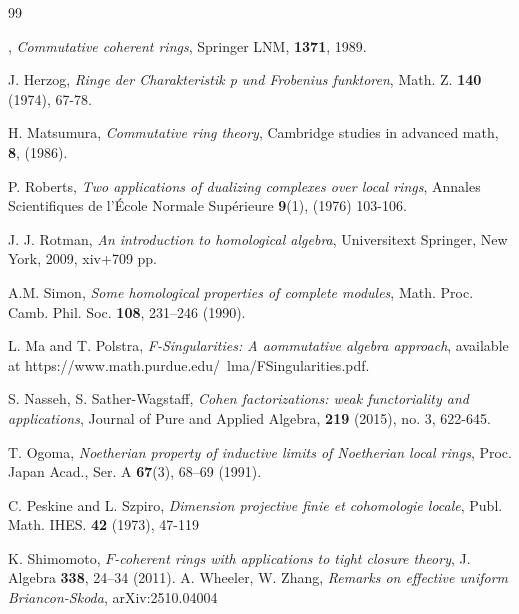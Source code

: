 \documentclass[11pt,a4paper]{amsart}
\numberwithin{equation}{section}
\theoremstyle{definition}
\theoremstyle{remark}
\begin{document}
\begin{thebibliography}{99}
		
, {\it Commutative coherent rings},
Springer LNM, {\bf1371}, 1989.
		
	 J. Herzog, \emph{Ringe der Charakteristik p und Frobenius funktoren}, Math. Z. 	{\bf140} (1974), 67-78.


		
	H. Matsumura, \emph{Commutative ring theory}, Cambridge studies in advanced math, \textbf{8}, (1986).
		
		 P. Roberts, \emph{Two applications of dualizing complexes over local rings}, Annales Scientifiques de l'École Normale Supérieure {\bf 9}(1), (1976) 103-106.

		
		
			
			J. J. Rotman,
		\emph{An introduction to homological algebra}, 
		Universitext
		Springer, New York, 2009, xiv+709 pp.

	A.M.
	Simon, \emph{Some homological properties of complete modules}, Math. Proc. Camb. Phil. Soc.
	{\bf108}, 231–246 (1990).
	
			 L. Ma and T. Polstra, 	\emph{F-Singularities: A aommutative algebra approach},   available at https://www.math.purdue.edu/~lma/FSingularities.pdf.
	
	S. Nasseh,	S. Sather-Wagstaff,
\emph{Cohen factorizations: weak functoriality and applications},   Journal of Pure and Applied Algebra, {\bf219} (2015), no. 3, 622-645.
	
	T. Ogoma, \emph{Noetherian property of inductive limits of Noetherian local rings},
	Proc. Japan Acad., Ser. A \textbf{{67}}(3), 68--69 (1991).
	
	
	C. Peskine and L. Szpiro, \emph{Dimension projective finie et cohomologie locale},
	Publ. Math. IHES. 
	{\bf42} 
	(1973), 47-119
	
	
	
	K. Shimomoto,
	\emph{$F$-coherent rings with applications to tight closure theory},
	J. Algebra {\bf338}, 24--34 (2011).
	A. Wheeler, W. Zhang,
	\emph{Remarks on effective uniform Briancon-Skoda}, arXiv:2510.04004


	 	
	\end{thebibliography}
	
\end{document}
